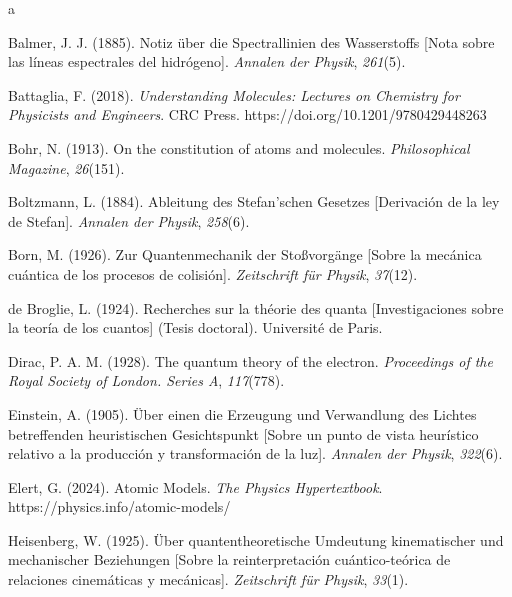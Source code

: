 \documentclass[11pt,a4paper,spanish]{book}
\begin{document}
\begin{thebibliography}{a}

   Balmer, J. J. (1885). Notiz über
  die Spectrallinien des Wasserstoffs [Nota sobre las líneas
  espectrales del hidrógeno]. \emph{Annalen der Physik},
  \emph{261}(5).

   Battaglia, F. (2018).
  \emph{Understanding Molecules: Lectures on Chemistry for Physicists
  and Engineers}. CRC Press. https://doi.org/10.1201/9780429448263

   Bohr, N. (1913). On the
  constitution of atoms and molecules. \emph{Philosophical Magazine},
  \emph{26}(151).

   Boltzmann, L. (1884).
  Ableitung des Stefan'schen Gesetzes [Derivación de la ley de
  Stefan]. \emph{Annalen der Physik}, \emph{258}(6).

   Born, M. (1926). Zur Quantenmechanik
  der Stoßvorgänge [Sobre la mecánica cuántica de los procesos de
  colisión]. \emph{Zeitschrift für Physik}, \emph{37}(12).

   de Broglie, L. (1924).
  Recherches sur la théorie des quanta [Investigaciones sobre la
  teoría de los cuantos] (Tesis doctoral). Université de Paris.

   Dirac, P. A. M. (1928). The
  quantum theory of the electron. \emph{Proceedings of the Royal
  Society of London. Series A}, \emph{117}(778).

   Einstein, A.
  (1905). Über einen die Erzeugung und Verwandlung des Lichtes
  betreffenden heuristischen Gesichtspunkt [Sobre un punto de vista
  heurístico relativo a la producción y transformación de la luz].
  \emph{Annalen der Physik}, \emph{322}(6).

   Elert, G. (2024). Atomic Models.
  \emph{The Physics Hypertextbook}.
  https://physics.info/atomic-models/

   Heisenberg, W. (1925).
  Über quantentheoretische Umdeutung kinematischer und mechanischer
  Beziehungen [Sobre la reinterpretación cuántico-teórica de
  relaciones cinemáticas y mecánicas]. \emph{Zeitschrift für Physik},
  \emph{33}(1).


\end{thebibliography}
\end{document}
